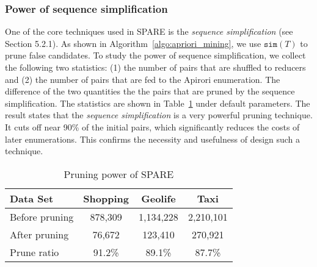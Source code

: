 \subsubsection{Power of sequence simplification}
One of the core techniques used in SPARE is the \emph{sequence simplification} (see Section 5.2.1). 
As shown in  Algorithm~\ref{algo:apriori_mining}, we use $\mathtt{sim}(T)$
to prune false candidates. To study the power of sequence simplification,
we collect the following two statistics: (1) the number of pairs that
are shuffled to reducers and (2) the number of pairs that
are fed to the Apirori enumeration. The difference of the two quantities
the the pairs that are pruned by the sequence simplification.
%
The
statistics are shown in Table~\ref{tbl:pruning} under default parameters. The result states that the \emph{sequence simplification} is a very powerful pruning technique. It cuts off near 90\% of the initial pairs, which significantly reduces the costs
of later enumerations. This confirms the necessity and usefulness of design such a technique.


\begin{table}[h]
\begin{tabular}{|l|c|c|c|}
\hline 
\textbf{Data Set} & \textbf{Shopping} & \textbf{Geolife} & \textbf{Taxi} \\ 
\hline 
Before pruning & 878,309 &  1,134,228 & 2,210,101 \\ 
\hline 
After pruning & 76,672 & 123,410 & 270,921 \\ 
\hline 
Prune ratio & 91.2\% & 89.1\% & 87.7\% \\ 
\hline 
\end{tabular} 
%
\caption{Pruning power of SPARE}
\label{tbl:pruning}
\end{table}

